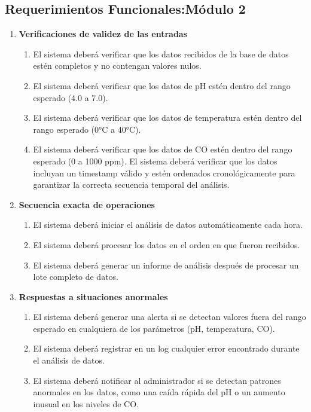 \subsection{Requerimientos Funcionales:Módulo 2}
 \begin{enumerate}
        \begin{enumerate}
            \item \textbf{Verificaciones de validez de las entradas}
                \begin{enumerate}
                    \item El sistema deberá verificar que los datos recibidos de la base de datos estén completos y no contengan valores nulos.
                    \item El sistema deberá verificar que los datos de pH estén dentro del rango esperado (4.0 a 7.0).
                    \item El sistema deberá verificar que los datos de temperatura estén dentro del rango esperado (0°C a 40°C).
                    \item El sistema deberá verificar que los datos de CO estén dentro del rango esperado (0 a 1000 ppm).
                    El sistema deberá verificar que los datos incluyan un timestamp válido y estén ordenados cronológicamente para garantizar la correcta secuencia temporal del análisis.
                \end{enumerate}   
            
            \item \textbf{Secuencia exacta de operaciones}
                \begin{enumerate}
                    \item El sistema deberá iniciar el análisis de datos automáticamente cada hora.
                    \item El sistema deberá procesar los datos en el orden en que fueron recibidos.
                    \item El sistema deberá generar un informe de análisis después de procesar un lote completo de datos.
                \end{enumerate}   
        
            \item \textbf{Respuestas a situaciones anormales}
                \begin{enumerate}
                    \item El sistema deberá generar una alerta si se detectan valores fuera del rango esperado en cualquiera de los parámetros (pH, temperatura, CO).
                    \item El sistema deberá registrar en un log cualquier error encontrado durante el análisis de datos.
                    \item El sistema deberá notificar al administrador si se detectan patrones anormales en los datos, como una caída rápida del pH o un aumento inusual en los niveles de CO.
                \end{enumerate}   
       

\end{enumerate}
\end{enumerate}
